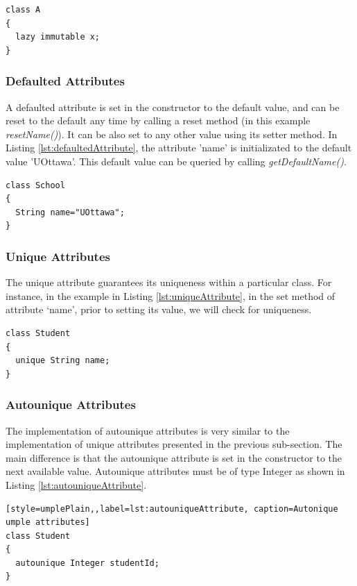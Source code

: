 \begin{lstlisting}[style=umplePlain,label=lst:lazyimmutableAttribute, caption=Lazy immutable Umple attribute]
class A 
{
  lazy immutable x;
}
\end{lstlisting}


\subsubsection{Defaulted Attributes}
A defaulted attribute is set in the constructor to the default value, and can be reset to the default any time by calling a reset method (in this example \textit{resetName()}). It can be also set to any other value using its setter method. In Listing \ref{lst:defaultedAttribute}, the attribute 'name' is initializated to the default value 'UOttawa'. This default value can be queried by calling \textit{getDefaultName()}.

\begin{lstlisting}[style=umplePlain,label=lst:defaultedAttribute, caption=Defaulted Umple attribute]
class School 
{
  String name="UOttawa";
}
\end{lstlisting}

\subsubsection{Unique Attributes}
The unique attribute guarantees its uniqueness within a particular class.
For instance, in the example in Listing \ref{lst:uniqueAttribute}, in the set method of attribute `name', prior to setting its value, we will check for uniqueness. 

\begin{lstlisting}[style=umplePlain,label=lst:uniqueAttribute, caption=Unique Umple attribute]
class Student 
{
  unique String name;
}
\end{lstlisting}

\subsubsection{Autounique Attributes}
The implementation of autounique attributes is very similar to the implementation of unique attributes presented in the previous sub-section. The main difference is that the autounique attribute is set in the constructor to the next available value. Autounique attributes must be of type Integer as shown in Listing \ref{lst:autouniqueAttribute}.

\begin{lstlisting}[style=umplePlain,,label=lst:autouniqueAttribute, caption=Autonique umple attributes]
class Student 
{
  autounique Integer studentId;
}
\end{lstlisting}

